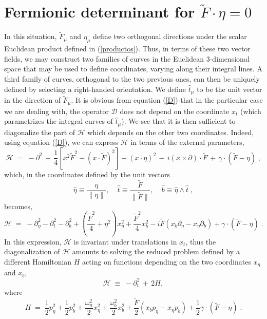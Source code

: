 \documentclass[a4paper,12pt]{article}
\newcommand{\Fd}{\widetilde{F}}
\newcommand{\n}{\eta}
\begin{document}
\section{Fermionic determinant for $\Fd \cdot \n=0$}\label{sec:first}
In this situation, $\Fd_\mu$ and $\n_\mu$ define two orthogonal directions
under the scalar Euclidean product defined in (\ref{productos}).
Thus, in terms of these two vector fields, we may construct two
families of curves in the Euclidean 3-dimensional space that may be
used to define coordinates, varying along their integral lines.  A
third family of curves, orthogonal to the two previous ones, can then
be uniquely defined by selecting a right-handed orientation.  We
define $\hat{t}_\mu$ to be the unit vector in the direction of $\Fd_\mu$.
It is obvious from equation (\ref{D}) that in the particular case we
are dealing with, the operator ${\mathcal D}$ does not depend on the
coordinate $x_t$ (which parametrizes the integral curves of
$\hat{t}_\mu$).  We see that it is then sufficient to diagonalize the
part of ${\mathcal H}$ which depends on the other two coordinates.
Indeed, using equation (\ref{D}), we can express ${\mathcal H}$ in
terms of the external parameters,
\begin{equation}\label{Htotal}
{\mathcal H}\;=\;-\partial^2\,+\,\frac{1}{4}[x^2\Fd^2-(x \cdot \Fd)^2]+(x \cdot \n)^2
\,-\,i (x \times \partial) \cdot \Fd\,+\,\gamma \cdot (\Fd-\n)\;,
\end{equation}
which, in the coordinates defined by the unit vectors
\begin{equation}
\hat{\n} \equiv \frac{\n}{\|\n\|},\;\;\;\; \hat{t} \equiv
\frac{\Fd}{\|\Fd\|},\;\;\;\; \hat{b} \equiv \hat{\n}\land
\hat{t}\;,
\end{equation}
becomes,
\begin{equation}\label{Hcoord}
{\mathcal H}\;=\;-\partial_\n^2-\partial_t^2-\partial_b^2+(\frac{\Fd^2}{4}+\n^2)x_\n^2
+\frac{\Fd^2}{4}x_b^2-i\Fd (x_b\partial_\n-x_\n\partial_b)+\gamma \cdot (\Fd-\n)\;.
\end{equation}
In this expression, ${\mathcal H}$ is invariant under translations in
$x_t$, thus the diagonalization of ${\mathcal H}$ amounts to
solving the reduced problem defined by a different Hamiltonian $H$
acting on functions depending on the two coordinates $x_\n$ and $x_b$,
\begin{equation}
{\mathcal H} \;\equiv\; -\partial_t^2\,+\,2H, 
\end{equation}
where
\begin{equation}\label{H}
H\;=\;\frac{1}{2}p_\n^2+\frac{1}{2}p_b^2+\frac{\omega_n^2}{2}x_\n^2
+\frac{\omega_b^2}{2}x_b^2 + \frac{\Fd}{2} (x_b p_\n-x_\n p_b)
+\frac{1}{2} \gamma \cdot (\Fd-\n) \;.
\end{equation}
\end{document}
